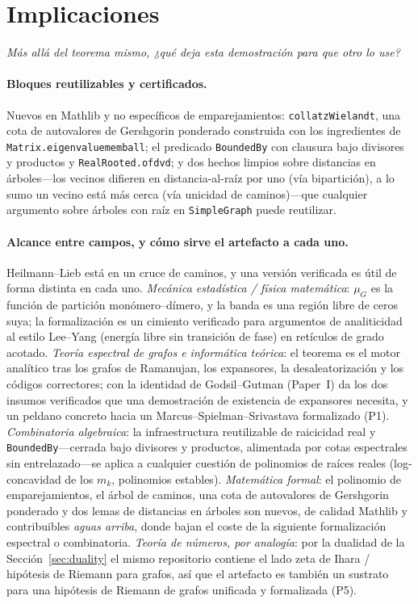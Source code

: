 \documentclass[11pt]{article}
\newcommand{\lean}[1]{{\def\_{\textunderscore\allowbreak}\texttt{#1}}}
\begin{document}
\section{Implicaciones}
\label{sec:implications}

\emph{M\'as all\'a del teorema mismo, ¿qu\'e deja esta demostraci\'on para que otro
lo use?}

\paragraph{Bloques reutilizables y certificados.} Nuevos en Mathlib y no
espec\'ificos de emparejamientos: \lean{collatzWielandt}, una cota de autovalores de
Gershgorin ponderado construida con los ingredientes de
\lean{Matrix.eigenvalue\_mem\_ball}; el predicado \lean{BoundedBy} con clausura bajo
divisores y productos y \lean{RealRooted.of\_dvd}; y dos hechos limpios sobre
distancias en \'arboles---los vecinos difieren en distancia-al-raíz por uno (v\'ia
bipartici\'on), a lo sumo un vecino est\'a m\'as cerca (v\'ia unicidad de
caminos)---que cualquier argumento sobre \'arboles con raíz en \lean{SimpleGraph}
puede reutilizar.

\paragraph{Alcance entre campos, y c\'omo sirve el artefacto a cada uno.}
Heilmann--Lieb est\'a en un cruce de caminos, y una versi\'on verificada es \'util de
forma distinta en cada uno. \emph{Mec\'anica estad\'istica / f\'isica
matem\'atica}: $\mu_G$ es la funci\'on de partici\'on mon\'omero--d\'imero, y la
banda es una regi\'on libre de ceros suya; la formalizaci\'on es un cimiento
verificado para argumentos de analiticidad al estilo Lee--Yang (energ\'ia libre sin
transici\'on de fase) en ret\'iculos de grado acotado. \emph{Teor\'ia espectral de
grafos e inform\'atica te\'orica}: el teorema es el motor anal\'itico tras los grafos
de Ramanujan, los expansores, la desaleatorizaci\'on y los c\'odigos correctores;
con la identidad de Godsil--Gutman (Paper~I) da los dos insumos verificados que una
demostraci\'on de existencia de expansores necesita, y un peldano concreto hacia un
Marcus--Spielman--Srivastava formalizado (P1). \emph{Combinatoria algebraica}: la
infraestructura reutilizable de raicicidad real y \lean{BoundedBy}---cerrada bajo
divisores y productos, alimentada por cotas espectrales sin entrelazado---se aplica a
cualquier cuesti\'on de polinomios de ra\'ices reales (log-concavidad de los $m_k$,
polinomios estables). \emph{Matem\'atica formal}: el polinomio de emparejamientos,
el \'arbol de caminos, una cota de autovalores de Gershgorin ponderado y dos lemas
de distancias en \'arboles son nuevos, de calidad Mathlib y contribuibles
\emph{aguas arriba}, donde bajan el coste de la siguiente formalizaci\'on espectral
o combinatoria. \emph{Teor\'ia de n\'umeros, por analog\'ia}: por la dualidad de la
Secci\'on~\ref{sec:duality} el mismo repositorio contiene el lado zeta de
Ihara / hip\'otesis de Riemann para grafos, as\'i que el artefacto es tambi\'en un
sustrato para una hip\'otesis de Riemann de grafos unificada y formalizada (P5).
\end{document}

